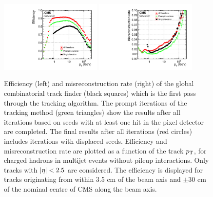 \begin{figure}[htbp]
\centering
     \includegraphics[width=0.45\textwidth]{object_reconstruction_and_selection/plots/pf_track_eff.pdf}
     \includegraphics[width=0.45\textwidth]{object_reconstruction_and_selection/plots/pf_track_misId.pdf}
     \caption{
Efficiency (left) and misreconstruction rate (right) of the global combinatorial track finder (black squares) 
which is the first pass through the tracking algorithm. The prompt iterations of the tracking method (green 
triangles) show the results after all iterations based on seeds with at least one 
hit in the pixel detector are completed. The final results after all iterations (red circles) includes
iterations with displaced seeds. Efficiency and misreconstruction rate are plotted as a function 
of the track $p_\mathrm{T}$, for charged hadrons in multijet events without pileup interactions. Only tracks with 
$\lvert\eta\rvert < 2.5$ are considered. The efficiency 
is displayed for tracks originating from within 3.5 cm of the beam axis and $\pm$30 cm of the nominal 
centre of CMS along the beam axis.
     }
     \label{fig:kf_tracking}
\end{figure}

